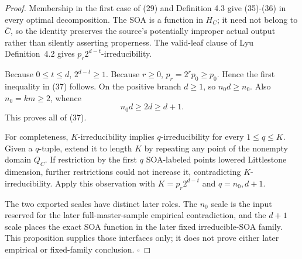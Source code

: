 \begin{proof}
Membership in the first case of (29) and Definition 4.3 give (35)-(36) in
every optimal decomposition. The SOA is a function in \(H_C\); it need not
belong to \(\bar C\), so the identity preserves the source's potentially
improper actual output rather than silently asserting properness.
The valid-leaf clause of Lyu~\citep{lyu2025} Definition~4.2 gives
\(p_r2^{d-t}\)-irreducibility.

Because \(0\le t\le d\), \(2^{d-t}\ge1\). Because \(r\ge0\),
\(p_r=2^rp_0\ge p_0\). Hence the first inequality in (37) follows.
On the positive branch \(d\ge1\), so \(n_0d\ge n_0\). Also
\(n_0=km\ge2\), whence
\[
 n_0d\ge2d\ge d+1.
\]
This proves all of (37).

For completeness, \(K\)-irreducibility implies \(q\)-irreducibility for
every \(1\le q\le K\). Given a \(q\)-tuple, extend it to length \(K\) by
repeating any point of the nonempty domain \(Q_C\). If restriction by the
first \(q\) SOA-labeled points lowered Littlestone dimension, further
restrictions could not increase it, contradicting \(K\)-irreducibility.
Apply this observation with
\(K=p_r2^{d-t}\) and \(q=n_0,d+1\).

The two exported scales have distinct later roles. The \(n_0\) scale is
the input reserved for the later full-master-sample empirical
contradiction, and the \(d+1\) scale places the exact SOA function in the
later fixed irreducible-SOA family. This proposition supplies those
interfaces only; it does not prove either later empirical or fixed-family
conclusion. \(\square\)


\end{proof}

